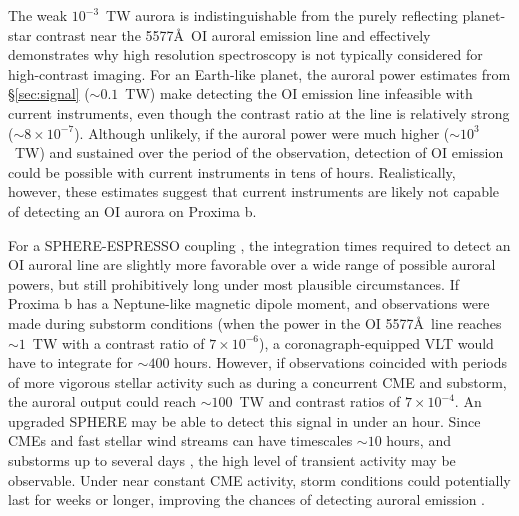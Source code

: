 \documentclass{emulateapj}
\newcommand{\yyy}[1]{{\color{black} #1}} %
\begin{document}
The weak $10^{-3}$~TW aurora is indistinguishable from the purely reflecting planet-star contrast near the 5577\AA\ OI auroral emission line \citep{Turbet2016,Meadows2016} and effectively demonstrates why high resolution spectroscopy is not typically considered for high-contrast imaging. %
For an Earth-like planet, the auroral power estimates from \S\ref{sec:signal} (${\sim} 0.1$~TW) make detecting the OI emission line infeasible with current instruments, even though the contrast ratio at the line is relatively strong (${\sim}8 \times 10^{-7}$). %
Although unlikely, if the auroral power were much higher (${\sim} 10^{3}$~TW) and sustained over the period of the observation, detection of OI emission could be possible with current instruments in tens of hours. %
Realistically, however, these estimates suggest that current instruments are likely not capable of detecting an OI aurora on Proxima b.

For a SPHERE-ESPRESSO coupling \citep{Lovis2016}, the integration times required to detect an OI auroral line are slightly more favorable over a wide range of possible auroral powers, but still prohibitively long under most plausible circumstances. If Proxima b has a Neptune-like magnetic dipole moment, and observations were made during substorm conditions (when the power in the OI 5577\AA\ line reaches ${\sim} 1$~TW with a contrast ratio of \yyy{$7 \times 10^{-6}$}), a coronagraph-equipped VLT would have to integrate for ${\sim} 400$ hours. However, if observations coincided with periods of more vigorous stellar activity such as during a concurrent CME and substorm, the auroral output could reach ${\sim} 100$~TW and contrast ratios of $7 \times 10^{-4}$.  An upgraded SPHERE may be able to detect this signal in under an hour. Since CMEs and fast stellar wind streams can have timescales ${\sim} 10$ hours, and substorms up to several days \citep{Gonzalez1994,Gonzalez1999}, the high level of transient activity may be observable.  Under near constant CME activity, storm conditions could potentially last for weeks or longer, improving the chances of detecting auroral emission  \citep{Khodachenko2007}.
\end{document}
